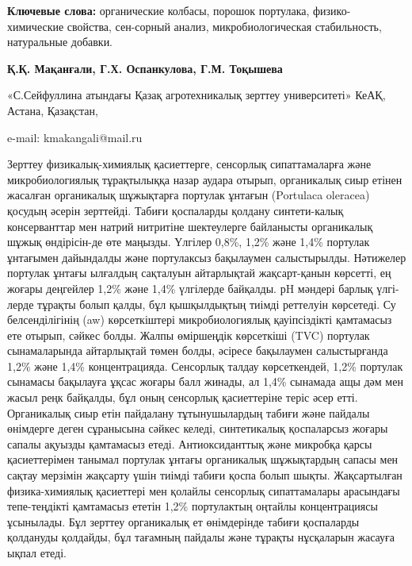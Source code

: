 {\bfseries Ключевые слова:} органические колбасы, порошок портулака,
физико-химические свойства, сен-сорный анализ, микробиологическая
стабильность, натуральные добавки.

\begin{center}

{\bfseries Қ.Қ. Мақанғали\envelope, Г.Х. Оспанкулова, Г.М.
Тоқышева}

«С.Сейфуллина атындағы Қазақ агротехникалық зерттеу университеті» КеАҚ,
Астана, Қазақстан,

e-mail: kmakangali@mail.ru
\end{center}

Зерттеу физикалық-химиялық қасиеттерге, сенсорлық сипаттамаларға және
микробиологиялық тұрақтылыққа назар аудара отырып, органикалық сиыр
етінен жасалған органикалық шұжықтарға портулак ұнтағын (Portulaca
oleracea) қосудың әсерін зерттейді. Табиғи қоспаларды қолдану
синтети-калық консерванттар мен натрий нитритіне шектеулерге байланысты
органикалық шұжық өндірісін-де өте маңызды. Үлгілер 0,8\%, 1,2\% және
1,4\% портулак ұнтағымен дайындалды және портулаксыз бақылаумен
салыстырылды. Нәтижелер портулак ұнтағы ылғалдың сақталуын айтарлықтай
жақсарт-қанын көрсетті, ең жоғары деңгейлер 1,2\% және 1,4\% үлгілерде
байқалды. рH мәндері барлық үлгі-лерде тұрақты болып қалды, бұл
қышқылдықтың тиімді реттелуін көрсетеді. Су белсенділігінің (aw)
көрсеткіштері микробиологиялық қауіпсіздікті қамтамасыз ете отырып,
сәйкес болды. Жалпы өміршеңдік көрсеткіші (TVC) портулак сынамаларында
айтарлықтай төмен болды, әсіресе бақылаумен салыстырғанда 1,2\% және
1,4\% концентрацияда. Сенсорлық талдау көрсеткендей, 1,2\% портулак
сынамасы бақылауға ұқсас жоғары балл жинады, ал 1,4\% сынамада ащы дәм
мен жасыл реңк байқалды, бұл оның сенсорлық қасиеттеріне теріс әсер
етті. Органикалық сиыр етін пайдалану тұтынушылардың табиғи және пайдалы
өнімдерге деген сұранысына сәйкес келеді, синтетикалық қоспаларсыз
жоғары сапалы ақуызды қамтамасыз етеді. Антиоксиданттық және микробқа
қарсы қасиеттерімен танымал портулак ұнтағы органикалық шұжықтардың
сапасы мен сақтау мерзімін жақсарту үшін тиімді табиғи қоспа болып
шықты. Жақсартылған физика-химиялық қасиеттері мен қолайлы сенсорлық
сипаттамалары арасындағы тепе-теңдікті қамтамасыз ететін 1,2\%
портулактың оңтайлы концентрациясы ұсынылады. Бұл зерттеу органикалық ет
өнімдерінде табиғи қоспаларды қолдануды қолдайды, бұл тағамның пайдалы
және тұрақты нұсқаларын жасауға ықпал етеді.

